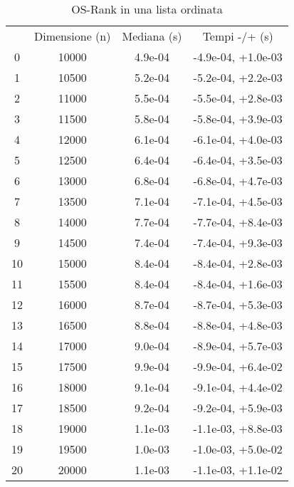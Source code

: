\begin{table}
\centering
\caption{OS-Rank in una lista ordinata}
\label{OS-Rank in una lista ordinata}
\begin{adjustbox}{width=1\textwidth/2}
\begin{tabular}{|c|c|c|c|}
\hline
 & Dimensione (n) & Mediana (s) & Tempi -/+ (s) \\
0 & 10000 & 4.9e-04 & -4.9e-04, +1.0e-03 \\
\cline{1-4}
1 & 10500 & 5.2e-04 & -5.2e-04, +2.2e-03 \\
\cline{1-4}
2 & 11000 & 5.5e-04 & -5.5e-04, +2.8e-03 \\
\cline{1-4}
3 & 11500 & 5.8e-04 & -5.8e-04, +3.9e-03 \\
\cline{1-4}
4 & 12000 & 6.1e-04 & -6.1e-04, +4.0e-03 \\
\cline{1-4}
5 & 12500 & 6.4e-04 & -6.4e-04, +3.5e-03 \\
\cline{1-4}
6 & 13000 & 6.8e-04 & -6.8e-04, +4.7e-03 \\
\cline{1-4}
7 & 13500 & 7.1e-04 & -7.1e-04, +4.5e-03 \\
\cline{1-4}
8 & 14000 & 7.7e-04 & -7.7e-04, +8.4e-03 \\
\cline{1-4}
9 & 14500 & 7.4e-04 & -7.4e-04, +9.3e-03 \\
\cline{1-4}
10 & 15000 & 8.4e-04 & -8.4e-04, +2.8e-03 \\
\cline{1-4}
11 & 15500 & 8.4e-04 & -8.4e-04, +1.6e-03 \\
\cline{1-4}
12 & 16000 & 8.7e-04 & -8.7e-04, +5.3e-03 \\
\cline{1-4}
13 & 16500 & 8.8e-04 & -8.8e-04, +4.8e-03 \\
\cline{1-4}
14 & 17000 & 9.0e-04 & -8.9e-04, +5.7e-03 \\
\cline{1-4}
15 & 17500 & 9.9e-04 & -9.9e-04, +6.4e-02 \\
\cline{1-4}
16 & 18000 & 9.1e-04 & -9.1e-04, +4.4e-02 \\
\cline{1-4}
17 & 18500 & 9.2e-04 & -9.2e-04, +5.9e-03 \\
\cline{1-4}
18 & 19000 & 1.1e-03 & -1.1e-03, +8.8e-03 \\
\cline{1-4}
19 & 19500 & 1.0e-03 & -1.0e-03, +5.0e-02 \\
\cline{1-4}
20 & 20000 & 1.1e-03 & -1.1e-03, +1.1e-02 \\
\cline{1-4}
\end{tabular}
\end{adjustbox}
\end{table}
